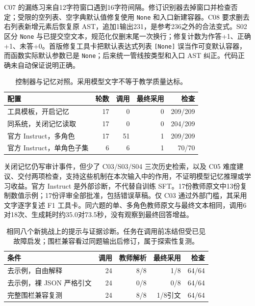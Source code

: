 C07 的漏练习来自12字符窗口遇到16字符间隔。修订识别器去掉窗口并检查否定；受限的空列表、空字典默认值修复使用 \texttt{None} 和入口新建容器。C08 要求删去右列表新增元素后恢复原 AST，追加1输出231，是参考236之外的合法变式。S02 区分 \texttt{None} 与已提交空文本，规范化仅删末尾一次换行；修复计数为作答+1、正确+1、未答+0。首版修复工具卡把默认表达式列表 \texttt{[None]} 误当作可变默认容器，而函数实际默认参数已是 \texttt{None}；后来统一管线按类型和入口 AST 纠正。代码正确未自动保证说明正确。

\begin{table}[htbp]\centering\small
\caption{控制器与记忆对照。采用模型文字不等于教学质量达标。}\label{tab:concise-agents-controls}
\begin{tabularx}{\linewidth}{@{}Yrrrr@{}}\toprule
配置 & 轮数 & 调用 & 最终采用 & 检查\\\midrule
工具模板，开启记忆 &17&0&0&209/209\\
同系统，关闭记忆读取 &17&0&0&204/209\\
官方 Instruct，多角色 &17&51&1&209/209\\
官方 Instruct，单角色子集 &6&6&1&70/70\\\bottomrule
\end{tabularx}
\end{table}\FloatBarrier

关闭记忆仍写审计事件，但少了 C03/S03/S04 三次历史检索，以及 C05 难度建议、交付两项检查，支持这些机制在本次输入中的作用，不证明模型记忆推理或学习收益。官方 Instruct 是外部诊断，不代替自训练 SFT。17份教师原文中13份复制数值示例；17份评审全部批准，包括错误草稿。仅 C03 通过外部门槛，其采用文字逐字复述 F1 工具卡。同六题的单、多角色教师原文与最终文本相同，调用6对18次、生成耗时约35.0对73.5秒，没有观察到最终回答增益。

\begin{table}[htbp]\centering\small
\caption{相同八个新挑战上的提示与证据诊断。任务在调用前冻结但受已见故障启发；围栏兼容看过同题输出后修订，属于探索性复测。}\label{tab:concise-agents-prompt}
\begin{tabularx}{\linewidth}{@{}Yrrrr@{}}\toprule
条件 & 调用 & 教师解析 & 最终采用 & 检查\\\midrule
去示例，自由解释 &24&8/8&1/8&64/64\\
去示例，裸 JSON 严格引文 &24&0/8&0/8&64/64\\
完整围栏兼容复测 &24&8/8&1/8引文&64/64\\\bottomrule
\end{tabularx}
\end{table}\FloatBarrier

